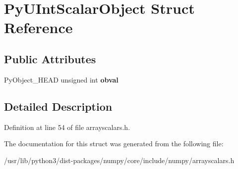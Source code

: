 \hypertarget{structPyUIntScalarObject}{}\section{Py\+U\+Int\+Scalar\+Object Struct Reference}
\label{structPyUIntScalarObject}
\subsection*{Public Attributes}
\begin{DoxyCompactItemize}
\item 
Py\+Object\+\_\+\+H\+E\+AD unsigned int {\bfseries obval}\hypertarget{structPyUIntScalarObject_a42442bf5cb2f6345805d698865242ecc}{}\label{structPyUIntScalarObject_a42442bf5cb2f6345805d698865242ecc}

\end{DoxyCompactItemize}


\subsection{Detailed Description}


Definition at line 54 of file arrayscalars.\+h.



The documentation for this struct was generated from the following file\+:\begin{DoxyCompactItemize}
\item 
/usr/lib/python3/dist-\/packages/numpy/core/include/numpy/arrayscalars.\+h\end{DoxyCompactItemize}
